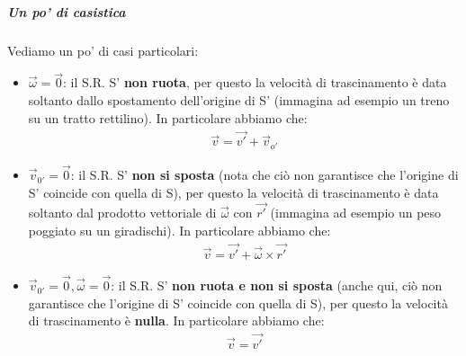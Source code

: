                 \subparagraph{Un po' di casistica}
                Vediamo un po' di casi particolari:
                \begin{itemize}
                    \item $\vec{\omega}=\vec{0}$: il S.R. S' \textbf{non ruota}, per questo la velocità di trascinamento è data soltanto dallo spostamento dell'origine di S' (immagina ad esempio un treno su un tratto rettilino). In particolare abbiamo che:
                    \begin{align*}
                        \vec{v}=\vec{v'}+\vec{v}_{o'}
                    \end{align*}
                    \item $\vec{v}_{0'}=\vec{0}$: il S.R. S' \textbf{non si sposta} (nota che ciò non garantisce che l'origine di S' coincide con quella di S), per questo la velocità di trascinamento è data soltanto dal prodotto vettoriale di $\vec{\omega}$ con $\vec{r'}$ (immagina ad esempio un peso poggiato su un giradischi).
                    In particolare abbiamo che:
                    \begin{align*}
                        \vec{v}=\vec{v'}+\vec{\omega}\times\vec{r'}
                    \end{align*}
                    \item $\vec{v}_{0'}=\vec{0}, \vec{\omega}=\vec{0}$: il S.R. S' \textbf{non ruota e non si sposta} (anche qui, ciò non garantisce che l'origine di S' coincide con quella di S), per questo la velocità di trascinamento è \textbf{nulla}.
                    In particolare abbiamo che:
                    \begin{align*}
                        \vec{v}=\vec{v'}
                    \end{align*}
                \end{itemize}

